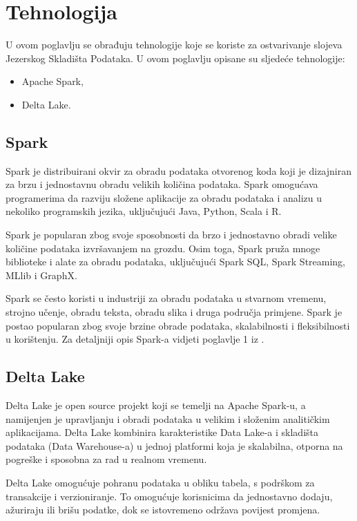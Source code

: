 \chapter{Tehnologija}
U ovom poglavlju se obrađuju tehnologije koje se koriste za ostvarivanje slojeva
Jezerskog Skladišta Podataka. U ovom poglavlju opisane su sljedeće tehnologije:
\begin{itemize}
    \item Apache Spark,
    \item Delta Lake.    
\end{itemize}

\section{Spark}
Spark je distribuirani okvir za obradu podataka otvorenog koda koji je
dizajniran za brzu i jednostavnu obradu velikih količina podataka. Spark
omogućava programerima da razviju složene aplikacije za obradu podataka i
analizu u nekoliko programskih jezika, uključujući Java, Python, Scala i R.

Spark je popularan zbog svoje sposobnosti da brzo i jednostavno obradi velike
količine podataka izvršavanjem na grozdu. Osim toga, Spark pruža mnoge
biblioteke i alate za obradu podataka, uključujući Spark SQL, Spark Streaming,
MLlib i GraphX.

Spark se često koristi u industriji za obradu podataka u stvarnom vremenu,
strojno učenje, obradu teksta, obradu slika i druga područja primjene. Spark je
postao popularan zbog svoje brzine obrade podataka, skalabilnosti i
fleksibilnosti u korištenju. Za detaljniji opis Spark-a vidjeti poglavlje 1 iz
\cite[c.1]{spark2020}.

\section{Delta Lake}
Delta Lake je open source projekt koji se temelji na Apache Spark-u, a
namijenjen je upravljanju i obradi podataka u velikim i složenim analitičkim
aplikacijama. Delta Lake kombinira karakteristike Data Lake-a i skladišta
podataka (Data Warehouse-a) u jednoj platformi koja je skalabilna, otporna na
pogreške i sposobna za rad u realnom vremenu.

Delta Lake omogućuje pohranu podataka u obliku tabela, s podrškom za transakcije
i verzioniranje. To omogućuje korisnicima da jednostavno dodaju, ažuriraju ili
brišu podatke, dok se istovremeno održava povijest promjena.

